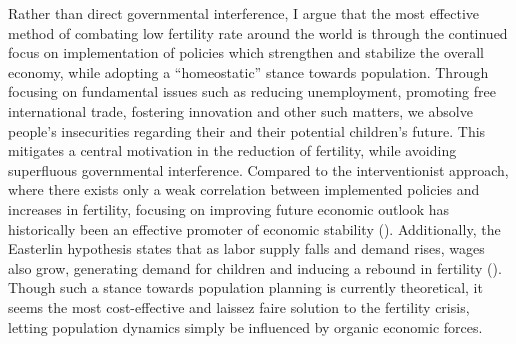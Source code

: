 \documentclass[12pt, a4paper, twoside]{article}
\begin{document}
Rather than direct governmental interference, I argue that the most effective method of combating low fertility rate around the world is through the continued focus on implementation of policies which strengthen and stabilize the overall economy, while adopting a “homeostatic” stance towards population. Through focusing on fundamental issues such as reducing unemployment, promoting free international trade, fostering innovation and other such matters, we absolve people’s insecurities regarding their and their potential children’s future. This mitigates a central motivation in the reduction of fertility, while avoiding superfluous governmental interference. Compared to the interventionist approach, where there exists only a weak correlation between implemented policies and increases in fertility, focusing on improving future economic outlook has historically been an effective promoter of economic stability (\cites[pp.\ 93–97]{kearney2023causes}{stern2022ways}). Additionally, the Easterlin hypothesis states that as labor supply falls and demand rises, wages also grow, generating demand for children and inducing a rebound in fertility (\cites{easterlin1987birth}[p.\ 31]{kohler2006low}). Though such a stance towards population planning is currently theoretical, it seems the most cost-effective and laissez faire solution to the fertility crisis, letting population dynamics simply be influenced by organic economic forces. 

\printbibliography
\end{document}
